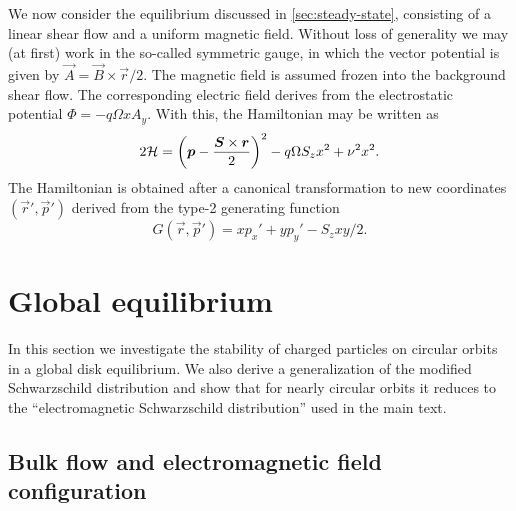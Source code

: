 \documentclass[aps,pre,notitlepage,amsmath,amssymb,amsfonts,nobibnotes,nofootinbib]{revtex4-1}
\begin{document}
We now consider the equilibrium discussed in \cref{sec:steady-state},
consisting of a linear shear flow and a uniform magnetic field. Without loss
of generality we may (at first) work in the so-called symmetric gauge, in
which the vector potential is given by $\vec{A}=\vec{B}\times\vec{r}/2$. The
magnetic field is assumed frozen into the background shear flow. The
corresponding electric field derives from the electrostatic potential
$\Phi=-q\Omega{}xA_y$. With this, the Hamiltonian may be written as
\begin{equation}
  \label{eq:shearing-sheet-hamiltonian}
  2\mathcal{H} = {\left(
    \vec{p} - \frac{\vec{S}\times\vec{r}}{2}
  \right)}^2 - q\Omega S_z x^2 + \vfreq^2 x^2.
\end{equation}
The Hamiltonian  is obtained after a canonical
transformation to new coordinates $(\vec{r}',\vec{p}')$ derived from the
type-2 generating function
\begin{equation}
  G(\vec{r},\vec{p}') = xp_x' + yp_y' - S_z xy/2.
\end{equation}

\section{Global equilibrium}
\label{app:global}

In this section we investigate the stability of charged particles on circular
orbits in a global disk equilibrium. We also derive a generalization of the
modified Schwarzschild distribution \citep{Shu1969} and show that for nearly
circular orbits it reduces to the ``electromagnetic Schwarzschild
distribution'' used in the main text.

\subsection{Bulk flow and electromagnetic field configuration}
\end{document}
